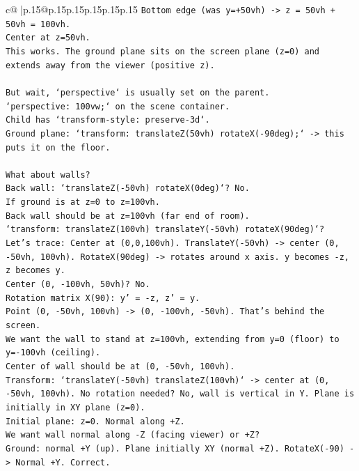 \documentclass{article}
\begin{document}
{\begin{supertabular}{c@{$\;$}|p{.15\linewidth}@{}p{.15\linewidth}p{.15\linewidth}p{.15\linewidth}p{.15\linewidth}p{.15\linewidth}}
{{{\texttt{Bottom edge (was y=+50vh) {-}> z = 50vh + 50vh = 100vh.} \\
\texttt{Center at z=50vh.} \\
\texttt{This works. The ground plane sits on the screen plane (z=0) and extends away from the viewer (positive z).} \\
\\ 
\texttt{But wait, `perspective` is usually set on the parent.} \\
\texttt{`perspective: 100vw;` on the scene container.} \\
\texttt{Child has `transform{-}style: preserve{-}3d`.} \\
\texttt{Ground plane: `transform: translateZ(50vh) rotateX({-}90deg);` {-}> this puts it on the floor.} \\
\\ 
\texttt{What about walls?} \\
\texttt{Back wall: `translateZ({-}50vh) rotateX(0deg)`? No.} \\
\texttt{If ground is at z=0 to z=100vh.} \\
\texttt{Back wall should be at z=100vh (far end of room).} \\
\texttt{`transform: translateZ(100vh) translateY({-}50vh) rotateX(90deg)`?} \\
\texttt{Let's trace: Center at (0,0,100vh). TranslateY({-}50vh) {-}> center (0, {-}50vh, 100vh). RotateX(90deg) {-}> rotates around x axis. y becomes {-}z, z becomes y.} \\
\texttt{Center (0, {-}100vh, 50vh)? No.} \\
\texttt{Rotation matrix X(90): y' = {-}z, z' = y.} \\
\texttt{Point (0, {-}50vh, 100vh) {-}> (0, {-}100vh, {-}50vh). That's behind the screen.} \\
\texttt{We want the wall to stand at z=100vh, extending from y=0 (floor) to y={-}100vh (ceiling).} \\
\texttt{Center of wall should be at (0, {-}50vh, 100vh).} \\
\texttt{Transform: `translateY({-}50vh) translateZ(100vh)` {-}> center at (0, {-}50vh, 100vh). No rotation needed? No, wall is vertical in Y. Plane is initially in XY plane (z=0).} \\
\texttt{Initial plane: z=0. Normal along +Z.} \\
\texttt{We want wall normal along {-}Z (facing viewer) or +Z?} \\
\texttt{Ground: normal +Y (up). Plane initially XY (normal +Z). RotateX({-}90) {-}> Normal +Y. Correct.} \\
}}}
\end{supertabular}}
\end{document}
